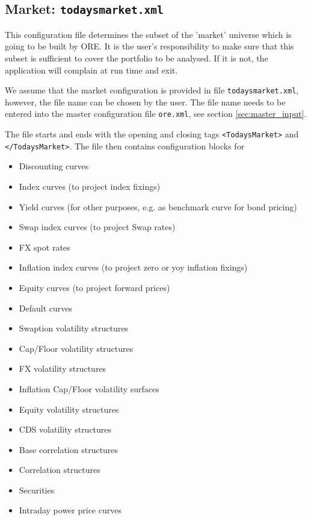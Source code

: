 \subsection{Market: {\tt todaysmarket.xml}}\label{sec:market}

This configuration file determines the subset of the 'market' universe which is going to be built by ORE. It is the
user's responsibility to make sure that this subset is sufficient to cover the portfolio to be analysed. If it is not,
the application will complain at run time and exit.

\medskip We assume that the market configuration is provided in file {\tt todaysmarket.xml}, however, the file name can
be chosen by the user. The file name needs to be entered into the master configuration file {\tt ore.xml}, see section
\ref{sec:master_input}.

\medskip 
The file starts and ends with the opening and closing tags {\tt <TodaysMarket>} 
and {\tt </TodaysMarket>}. The file then contains configuration blocks for
\begin{itemize}
\item Discounting curves
\item Index curves (to project index fixings)
\item Yield curves (for other purposes, e.g. as benchmark curve for bond pricing)
\item Swap index curves (to project Swap rates)
\item FX spot rates
\item Inflation index curves (to project zero or yoy inflation fixings)
\item Equity curves (to project forward prices)
\item Default curves
\item Swaption volatility structures
\item Cap/Floor volatility structures
\item FX volatility structures
\item Inflation Cap/Floor volatility surfaces
\item Equity volatility structures
\item CDS volatility structures
\item Base correlation structures
\item Correlation structures
\item Securities
\item Intraday power price curves
\end{itemize}

